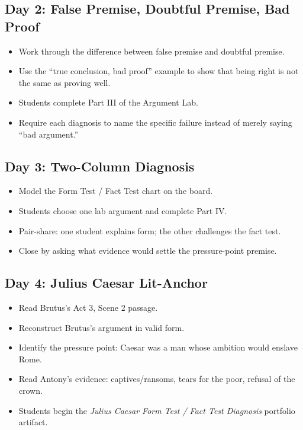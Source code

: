 \documentclass[12pt]{article}
\begin{document}
\subsection*{Day 2: False Premise, Doubtful Premise, Bad Proof}
\begin{itemize}[leftmargin=*]
\item Work through the difference between false premise and doubtful premise.
\item Use the ``true conclusion, bad proof'' example to show that being right is not the same as proving well.
\item Students complete Part III of the Argument Lab.
\item Require each diagnosis to name the specific failure instead of merely saying ``bad argument.''
\end{itemize}

\subsection*{Day 3: Two-Column Diagnosis}
\begin{itemize}[leftmargin=*]
\item Model the Form Test / Fact Test chart on the board.
\item Students choose one lab argument and complete Part IV.
\item Pair-share: one student explains form; the other challenges the fact test.
\item Close by asking what evidence would settle the pressure-point premise.
\end{itemize}

\subsection*{Day 4: Julius Caesar Lit-Anchor}
\begin{itemize}[leftmargin=*]
\item Read Brutus's Act 3, Scene 2 passage.
\item Reconstruct Brutus's argument in valid form.
\item Identify the pressure point: Caesar was a man whose ambition would enslave Rome.
\item Read Antony's evidence: captives/ransoms, tears for the poor, refusal of the crown.
\item Students begin the \textit{Julius Caesar Form Test / Fact Test Diagnosis} portfolio artifact.
\end{itemize}
\end{document}
